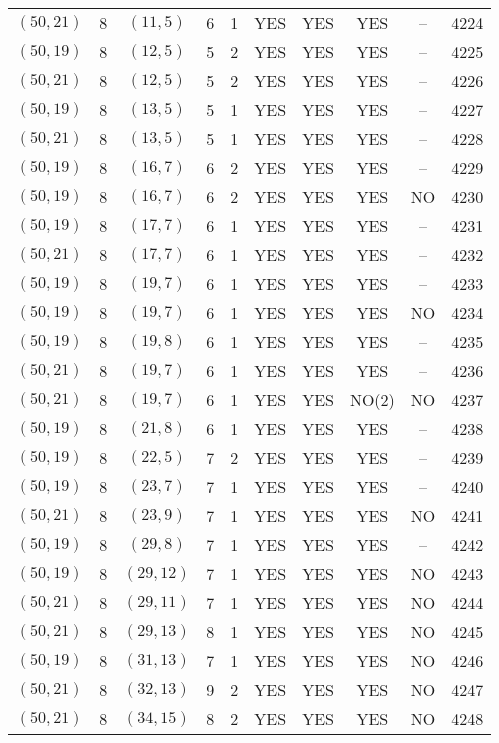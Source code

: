 \begin{longtable}{|c|c|c|c|c|c|c|c|c|c|}
$(50, 21)$ & 8 & $(11, 5)$ & 6 & 1 & YES & YES & YES & -- & 4224\\
$(50, 19)$ & 8 & $(12, 5)$ & 5 & 2 & YES & YES & YES & -- & 4225\\
$(50, 21)$ & 8 & $(12, 5)$ & 5 & 2 & YES & YES & YES & -- & 4226\\
$(50, 19)$ & 8 & $(13, 5)$ & 5 & 1 & YES & YES & YES & -- & 4227\\
$(50, 21)$ & 8 & $(13, 5)$ & 5 & 1 & YES & YES & YES & -- & 4228\\
$(50, 19)$ & 8 & $(16, 7)$ & 6 & 2 & YES & YES & YES & -- & 4229\\
$(50, 19)$ & 8 & $(16, 7)$ & 6 & 2 & YES & YES & YES & NO & 4230\\
$(50, 19)$ & 8 & $(17, 7)$ & 6 & 1 & YES & YES & YES & -- & 4231\\
$(50, 21)$ & 8 & $(17, 7)$ & 6 & 1 & YES & YES & YES & -- & 4232\\
$(50, 19)$ & 8 & $(19, 7)$ & 6 & 1 & YES & YES & YES & -- & 4233\\
$(50, 19)$ & 8 & $(19, 7)$ & 6 & 1 & YES & YES & YES & NO & 4234\\
$(50, 19)$ & 8 & $(19, 8)$ & 6 & 1 & YES & YES & YES & -- & 4235\\
$(50, 21)$ & 8 & $(19, 7)$ & 6 & 1 & YES & YES & YES & -- & 4236\\
$(50, 21)$ & 8 & $(19, 7)$ & 6 & 1 & YES & YES & NO(2) & NO & 4237\\
$(50, 19)$ & 8 & $(21, 8)$ & 6 & 1 & YES & YES & YES & -- & 4238\\
$(50, 19)$ & 8 & $(22, 5)$ & 7 & 2 & YES & YES & YES & -- & 4239\\
$(50, 19)$ & 8 & $(23, 7)$ & 7 & 1 & YES & YES & YES & -- & 4240\\
$(50, 21)$ & 8 & $(23, 9)$ & 7 & 1 & YES & YES & YES & NO & 4241\\
$(50, 19)$ & 8 & $(29, 8)$ & 7 & 1 & YES & YES & YES & -- & 4242\\
$(50, 19)$ & 8 & $(29, 12)$ & 7 & 1 & YES & YES & YES & NO & 4243\\
$(50, 21)$ & 8 & $(29, 11)$ & 7 & 1 & YES & YES & YES & NO & 4244\\
$(50, 21)$ & 8 & $(29, 13)$ & 8 & 1 & YES & YES & YES & NO & 4245\\
$(50, 19)$ & 8 & $(31, 13)$ & 7 & 1 & YES & YES & YES & NO & 4246\\
$(50, 21)$ & 8 & $(32, 13)$ & 9 & 2 & YES & YES & YES & NO & 4247\\
$(50, 21)$ & 8 & $(34, 15)$ & 8 & 2 & YES & YES & YES & NO & 4248\\

\end{longtable}
